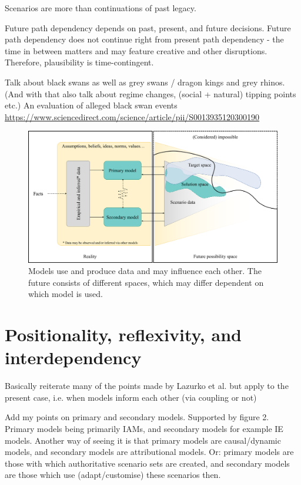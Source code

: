 \documentclass{article}
\begin{document}
\begin{refsection}
Scenarios are more than continuations of past legacy.

Future path dependency depends on past, present, and future decisions. Future path dependency does not continue right from present path dependency - the time in between matters and may feature creative and other disruptions. Therefore, plausibility is time-contingent.

Talk about black swans as well as grey swans / dragon kings and grey rhinos. 
(And with that also talk about regime changes, (social + natural) tipping points etc.)
An evaluation of alleged black swan events \url{https://www.sciencedirect.com/science/article/pii/S0013935120300190}


\begin{figure} [ht]
    \includegraphics[width=\textwidth]{Model_spaces.png} 
    \caption[Another caption for list of figures]{Models use and produce data and may influence each other. The future consists of different spaces, which may differ dependent on which model is used.}
    \label{fig:model_spaces}
\end{figure}


\label{main_part}
\section{Positionality, reflexivity, and interdependency}

Basically reiterate many of the points made by Lazurko et al. but apply to the present case, i.e. when models inform each other (via coupling or not)

Add my points on primary and secondary models. Supported by figure 2. 
Primary models being primarily IAMs, and secondary models for example IE models. Another way of seeing it is that primary models are causal/dynamic models, and secondary models are attributional models. Or: primary models are those with which authoritative scenario sets are created, and secondary models are those which use (adapt/customise) these scenarios then.


\end{refsection}
\end{document}
